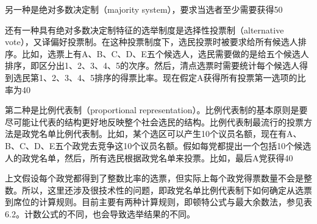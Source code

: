 另一种是绝对多数决定制（majority system），要求当选者至少需要获得50%

还有一种具有绝对多数决定制特征的选举制度是选择性投票制（alternative vote），又译偏好投票制。在这种投票制度下，选民投票时被要求给所有候选人排序。比如，选票上有A、B、C、D、E五个候选人，选民需要做的是给五个候选人排序，即区分出1、2、3、4、5的次序。然后，清点选票时需要统计每个候选人得到选民第1、2、3、4、5排序的得票比率。现在假定A获得所有投票第一选项的比率为40%

第二种是比例代表制（proportional representation）。比例代表制的基本原则是要尽可能让代表的结构更好地反映整个社会选民的结构。比例代表制最流行的投票方法是政党名单比例代表制。比如，某个选区可以产生10个议员名额，现在有A、B、C、D、E五个政党去竞争这10个议员名额。假如每党都提出一个包括10个候选人的政党名单，然后，所有选民根据政党名单来投票。比如，最后A党获得40%

上文假设每个政党都得到了整数比率的选票，但实际上每个政党得票数量不会是整数。所以，这里还涉及很技术性的问题，即政党名单比例代表制下如何确定从选票到席位的计算规则。目前主要有两种计算规则，即顿特公式与最大余数法，参见表6.2。计数公式的不同，也会导致选举结果的不同。

